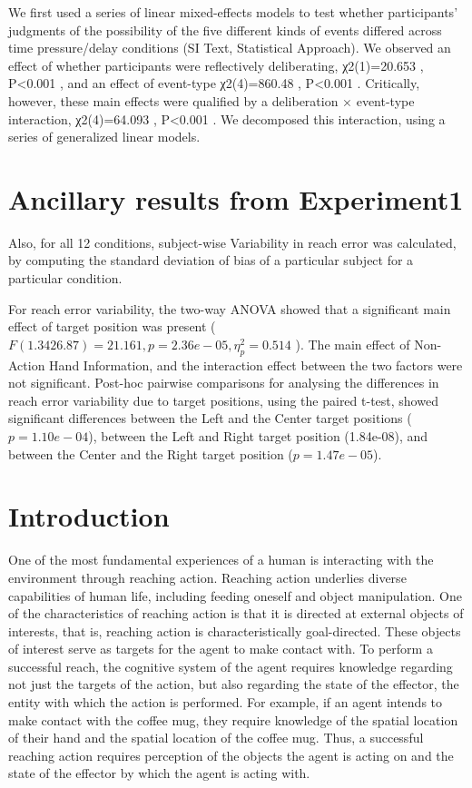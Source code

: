 We first used a series of linear mixed-effects models to test whether participants’ judgments of the possibility of the five different kinds of events differed across time pressure/delay conditions (SI Text, Statistical Approach). We observed an effect of whether participants were reflectively deliberating, χ2(1)=20.653
, P<0.001
, and an effect of event-type χ2(4)=860.48
, P<0.001
. Critically, however, these main effects were qualified by a deliberation ×
 event-type interaction, χ2(4)=64.093
, P<0.001
. We decomposed this interaction, using a series of generalized linear models.

\section{Ancillary results from Experiment1}

Also, for all 12 conditions, subject-wise Variability in reach error was calculated, by computing the standard deviation of bias of a particular subject for a particular condition.

For reach error variability, the two-way ANOVA showed that a significant main effect of target position was present ( $F(1.34 26.87) = 21.161 , p = 2.36e-05, \eta_{p}^{2} = 0.514$ ). The main effect of Non-Action Hand Information, and the interaction effect between the two factors were not significant. Post-hoc pairwise comparisons for analysing the differences in reach error variability due to target positions, using the paired t-test, showed significant differences between the Left and the Center target positions ($p = 1.10e-04$), between the Left and Right target position (1.84e-08), and between the Center and the Right target position ($p = 1.47e-05$). 


\section{Introduction}

One of the most fundamental experiences of a human is interacting with the environment through reaching action. Reaching action underlies diverse capabilities of human life, including feeding oneself and object manipulation. \cite{kim_psychology_2021} One of the characteristics of reaching action is that it is directed at external objects of interests, that is, reaching action is characteristically goal-directed. These objects of interest serve as targets for the agent to make contact with. To perform a successful reach, the cognitive system of the agent requires knowledge regarding not just the targets of the action, but also regarding the state of the effector, the entity with which the action is performed. For example, if an agent intends to make contact with the coffee mug, they require knowledge of the spatial location of their hand and the spatial location of the coffee mug. Thus, a successful reaching action requires perception of the objects the agent is acting on and the state of the effector by which the agent is acting with. \cite{wong2014multimodality}


